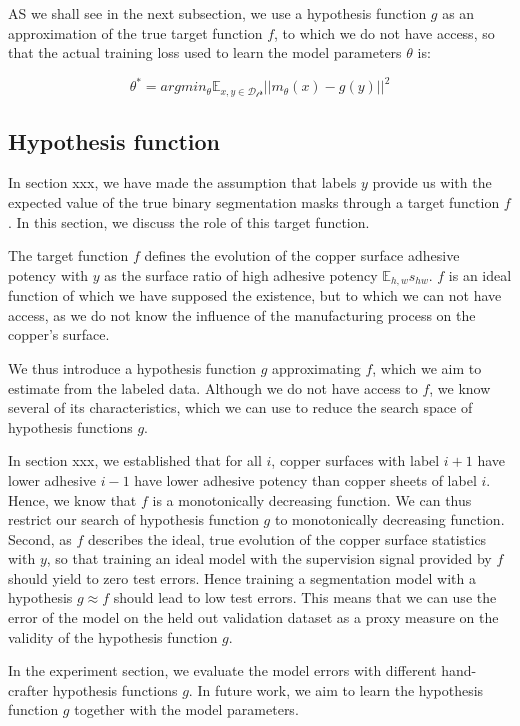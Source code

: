 \documentclass[10pt,twocolumn,letterpaper]{article}
\begin{document}
AS we shall see in the next subsection, we use a hypothesis function $g$ 
as an approximation of the true target function $f$, to which we do not have access, 
so that the actual training loss used to learn the model parameters $\theta$ is:

$$\theta^* = argmin_{\theta} \mathbb{E}_{x,y \in \mathcal{D_tr}} ||m_{\theta}(x) - g(y) ||^2 $$

\subsection{Hypothesis function}

In section xxx, we have made the assumption 
that labels $y$ provide us with the expected value 
of the true binary segmentation masks through a target function $f$.
In this section, we discuss the role of this target function.

The target function $f$ defines the evolution of the copper surface adhesive potency with $y$ as the surface ratio of high adhesive potency $\mathbb{E}_{h,w}s_{hw}$.
$f$ is an ideal function of which we have supposed the existence, 
but to which we can not have access,
as we do not know the influence of the manufacturing process on the copper's surface.

We thus introduce a hypothesis function $g$ approximating $f$,
which we aim to estimate from the labeled data.
Although we do not have access to $f$, we know several of its characteristics,
which we can use to reduce the search space of hypothesis functions $g$.

In section xxx, we established that for all $i$, copper surfaces with label $i+1$ have lower 
adhesive $i-1$ have lower adhesive potency than copper sheets of label $i$.
Hence, we know that $f$ is a monotonically decreasing function.
We can thus restrict our search of hypothesis function $g$ to monotonically decreasing function.
Second, as $f$ describes the ideal, true evolution of the copper surface statistics with $y$,
so that training an ideal model with the supervision signal provided by $f$ should yield to zero test errors.
Hence training a segmentation model with a hypothesis $g \approx f$ should lead to low test errors.
This means that we can use the error of the model on the held out validation dataset as a proxy measure on
the validity of the hypothesis function $g$.

In the experiment section, we evaluate the model errors with different hand-crafter hypothesis functions $g$.
In future work, we aim to learn the hypothesis function $g$ together with the model parameters.
\end{document}
